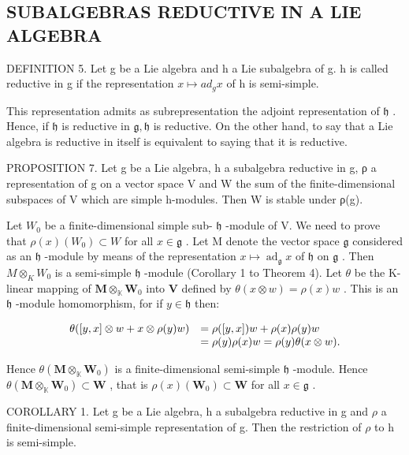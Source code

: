 \subsection{SUBALGEBRAS REDUCTIVE IN A LIE ALGEBRA}

DEFINITION 5. Let g be a Lie algebra and h a Lie subalgebra of g. h is called reductive in g if the representation \(x \mapsto ad_{g} x\) of h is semi-simple.

This representation admits as subrepresentation the adjoint representation of \(\mathfrak{h}\) . Hence, if \(\mathfrak{h}\) is reductive in \(\mathfrak{g},\mathfrak{h}\) is reductive. On the other hand, to say that a Lie algebra is reductive in itself is equivalent to saying that it is reductive.

PROPOSITION 7. Let g be a Lie algebra, h a subalgebra reductive in g, ρ a representation of g on a vector space V and W the sum of the finite-dimensional subspaces of V which are simple h-modules. Then W is stable under ρ(g).

Let \(W_0\) be a finite-dimensional simple sub- \(\mathfrak{h}\) -module of V. We need to prove that \(\rho(x)(W_0) \subset W\) for all \(x \in \mathfrak{g}\) . Let M denote the vector space \(\mathfrak{g}\) considered as an \(\mathfrak{h}\) -module by means of the representation \(x \mapsto \operatorname{ad}_{\mathfrak{g}} x\) of \(\mathfrak{h}\) on \(\mathfrak{g}\) . Then \(M \otimes_{K} W_0\) is a semi-simple \(\mathfrak{h}\) -module (Corollary 1 to Theorem 4). Let \(\theta\) be the K-linear mapping of \(\mathbf{M} \otimes_{\mathbb{K}} \mathbf{W}_0\) into \(\mathbf{V}\) defined by \(\theta(x \otimes w) = \rho(x)w\) . This is an \(\mathfrak{h}\) -module homomorphism, for if \(y \in \mathfrak{h}\) then:

\[
\begin{array}{r l} \theta ([ y, x ] \otimes w + x \otimes \rho (y) w) & = \rho ([ y, x ]) w + \rho (x) \rho (y) w \\ & = \rho (y) \rho (x) w = \rho (y) \theta (x \otimes w). \end{array}
\]

Hence \(\theta (\mathbf{M}\otimes_{\mathbb{K}}\mathbf{W}_0)\) is a finite-dimensional semi-simple \(\mathfrak{h}\) -module. Hence \(\theta (\mathbf{M}\otimes_{\mathbb{K}}\mathbf{W}_0)\subset \mathbf{W}\) , that is \(\rho (x)(\mathbf{W}_0)\subset \mathbf{W}\) for all \(x\in \mathfrak{g}\) .

COROLLARY 1. Let g be a Lie algebra, h a subalgebra reductive in g and \(\rho\) a finite-dimensional semi-simple representation of g. Then the restriction of \(\rho\) to h is semi-simple.

